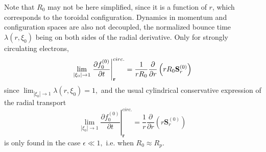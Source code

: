 Note that $R_{0}$ may not be here simplified, since it is a function of $r$,
which corresponds to the toroidal configuration. Dynamics in momentum and
configuration spaces are also not decoupled, the normalized bounce time $%
\lambda \left( r,\xi _{0}\right) $ being on both sides of the radial
derivative. Only for strongly circulating electrons,
\begin{equation}
\lim_{\left| \xi _{0}\right| \rightarrow 1}\left. \frac{\partial
f_{0}^{\left( 0\right) }}{\partial t}\right| _{\mathbf{r}}^{circ.}=\frac{1}{%
rR_{0}}\frac{\partial }{\partial r}\left( rR_{0}\mathbf{S}_{r}^{\left(
0\right) }\right)
\end{equation}
since $\lim_{\left| \xi _{0}\right| \rightarrow 1}\lambda \left( r,\xi
_{0}\right) =1,$ and the usual cylindrical conservative expression of the
radial transport
\begin{equation}
\lim_{\left| \xi _{0}\right| \rightarrow 1}\left. \frac{\partial
f_{0}^{\left( 0\right) }}{\partial t}\right| _{\mathbf{r}}^{circ.}=\frac{1}{r%
}\frac{\partial }{\partial r}\left( r\mathbf{S}_{r}^{\left( 0\right) }\right)
\end{equation}
is only found in the case $\epsilon \ll 1,$ i.e. when $R_{0}\approx R_{p}.$
